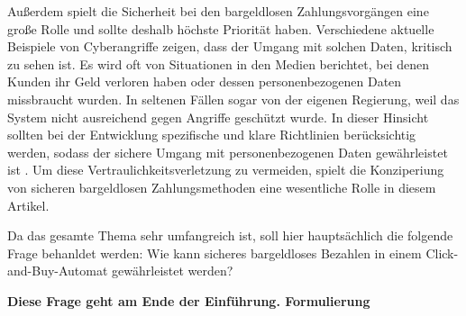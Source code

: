 Außerdem spielt die Sicherheit bei den bargeldlosen Zahlungsvorgängen eine große Rolle und sollte
deshalb höchste Priorität haben. Verschiedene aktuelle Beispiele von Cyberangriffe zeigen, dass der 
Umgang mit solchen Daten, kritisch zu sehen ist. Es wird oft von Situationen in den Medien berichtet,
bei denen Kunden ihr Geld verloren haben oder dessen personenbezogenen Daten missbraucht wurden. 
In seltenen Fällen sogar von der eigenen Regierung, weil das System nicht ausreichend gegen Angriffe 
geschützt wurde. In dieser Hinsicht sollten bei der Entwicklung spezifische und klare Richtlinien 
berücksichtig werden, sodass der sichere Umgang mit personenbezogenen Daten gewährleistet ist 
\cite{refart:TRVR}. Um diese Vertraulichkeitsverletzung zu vermeiden, spielt die Konziperiung von 
sicheren bargeldlosen Zahlungsmethoden eine wesentliche Rolle in diesem Artikel. 

Da das gesamte Thema sehr umfangreich ist, soll hier hauptsächlich die folgende Frage behanldet werden: 
Wie kann sicheres bargeldloses Bezahlen in einem Click-and-Buy-Automat gewährleistet werden?

\textbf{Diese Frage geht am Ende der Einführung. Formulierung}
